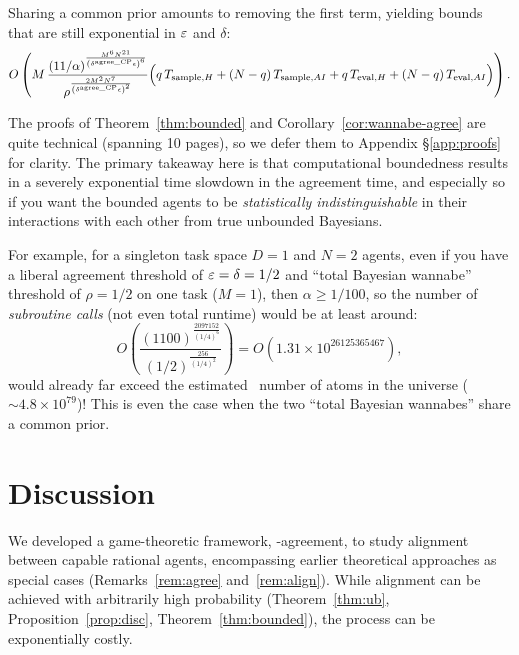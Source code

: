 \begin{corollary}
Sharing a common prior amounts to removing the first term, yielding bounds that are still exponential in $\varepsilon$ and $\delta$:
\begin{equation*}
O\left(M\,\frac{\left(11/\alpha\right)^{\frac{M^6 N^{21}}{\left(\delta^{\text{agree\_CP}}\epsilon\right)^6}}}{\rho^{\frac{2M^2 N^7}{\left(\delta^{\text{agree\_CP}}\epsilon\right)^2}}}
\Bigl( q\,T_{\text{sample},H} + (N-q)\,T_{\text{sample},AI} + q\,T_{\text{eval},H} + (N-q)\,T_{\text{eval},AI} \Bigr)
\right).
\end{equation*}
\end{corollary}
The proofs of Theorem~\ref{thm:bounded} and Corollary~\ref{cor:wannabe-agree} are quite technical (spanning 10 pages), so we defer them to Appendix \S\ref{app:proofs} for clarity.
The primary takeaway here is that computational boundedness results in a severely exponential time slowdown in the agreement time, and especially so if you want the bounded agents to be \emph{statistically indistinguishable} in their interactions with each other from true unbounded Bayesians.

For example, for a singleton task space $D = 1$ and $N=2$ agents, even if you have a liberal agreement threshold of $\varepsilon = \delta = 1/2$ and ``total Bayesian wannabe'' threshold of $\rho = 1/2$ on one task ($M=1$), then $\alpha \ge 1/100$, so the number of \emph{subroutine calls} (not even total runtime) would be at least around:
\begin{equation*}
O\left(\frac{\left(1100\right)^{\frac{2097152}{\left(1/4\right)^6}}}{\left(1/2\right)^{\frac{256}{\left(1/4\right)^2}}}\right) = O\left(1.31 \times 10^{26125365467}\right),
\end{equation*}
would already far exceed the estimated~\citep[pg. 19]{Munafo_Notable_Numbers} number of atoms in the universe ($\sim 4.8 \times 10^{79}$)!
This is even the case when the two ``total Bayesian wannabes'' share a common prior.

\section{Discussion}
\label{sec:discussion}
We developed a game-theoretic framework, \agree-agreement, to study alignment between capable rational agents, encompassing earlier theoretical approaches as special cases (Remarks~\ref{rem:agree} and~\ref{rem:align}).
While alignment can be achieved with arbitrarily high probability (Theorem~\ref{thm:ub}, Proposition~\ref{prop:disc}, Theorem~\ref{thm:bounded}), the process can be exponentially costly.

